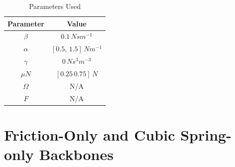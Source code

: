 \documentclass[12pt]{article}
\begin{document}
\begin{table}[!h]
  \centering
  \caption{Parameters Used}
  \begin{tabular}[t]{c|c}
    \hline\hline
    \textbf{Parameter} & \textbf{Value}\\\hline
    $\beta$ & $0.1\,Ns m^{-1}$\\
    $\alpha$ & $[0.5,\,1.5]\, N m^{-1}$\\
    $\gamma$ & $0\, Ns^3 m^{-3}$\\
    $\mu N$ & $[0.25\,0.75]\, N$\\
    $\Omega$ & N/A\\
    $F$ & N/A\\
    \hline\hline
  \end{tabular}
\end{table}
\pagebreak

\section{Friction-Only and Cubic Spring-only Backbones}
\label{sec:friction-only-cubic}
\end{document}
